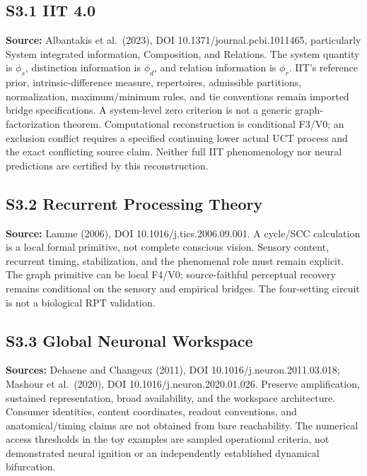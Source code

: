 \documentclass[
  11pt,
  a4paper,
]{article}
\begin{document}
\hypertarget{s3.1-iit-4.0}{%
\subsection{S3.1 IIT 4.0}\label{s3.1-iit-4.0}}

\textbf{Source:} Albantakis et al.~(2023), DOI
10.1371/journal.pcbi.1011465, particularly System integrated
information, Composition, and Relations. The system quantity is
\(\phi_s\), distinction information is \(\phi_d\), and relation
information is \(\phi_r\). IIT's reference prior, intrinsic-difference
measure, repertoires, admissible partitions, normalization,
maximum/minimum rules, and tie conventions remain imported bridge
specifications. A system-level zero criterion is not a generic
graph-factorization theorem. Computational reconstruction is conditional
F3/V0; an exclusion conflict requires a specified continuing lower
actual UCT process and the exact conflicting source claim. Neither full
IIT phenomenology nor neural predictions are certified by this
reconstruction.

\hypertarget{s3.2-recurrent-processing-theory}{%
\subsection{S3.2 Recurrent Processing
Theory}\label{s3.2-recurrent-processing-theory}}

\textbf{Source:} Lamme (2006), DOI 10.1016/j.tics.2006.09.001. A
cycle/SCC calculation is a local formal primitive, not complete
conscious vision. Sensory content, recurrent timing, stabilization, and
the phenomenal role must remain explicit. The graph primitive can be
local F4/V0; source-faithful perceptual recovery remains conditional on
the sensory and empirical bridges. The four-setting circuit is not a
biological RPT validation.

\hypertarget{s3.3-global-neuronal-workspace}{%
\subsection{S3.3 Global Neuronal
Workspace}\label{s3.3-global-neuronal-workspace}}

\textbf{Sources:} Dehaene and Changeux (2011), DOI
10.1016/j.neuron.2011.03.018; Mashour et al.~(2020), DOI
10.1016/j.neuron.2020.01.026. Preserve amplification, sustained
representation, broad availability, and the workspace architecture.
Consumer identities, content coordinates, readout conventions, and
anatomical/timing claims are not obtained from bare reachability. The
numerical access thresholds in the toy examples are sampled operational
criteria, not demonstrated neural ignition or an independently
established dynamical bifurcation.
\end{document}

